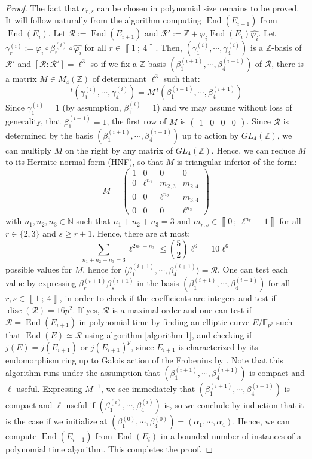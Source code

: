 \documentclass[a4paper,10pt]{report}
\theoremstyle{definition}
\theoremstyle{plain}
\theoremstyle{definition}
\newcommand{\N}{\mathbb{N}}
\newcommand{\Z}{\mathbb{Z}}
\newcommand{\F}{\mathbb{F}}
\newcommand{\m}[1]{\mathcal{#1}}
\renewcommand{\i}[2]{\left\llbracket #1~;~#2\right\rrbracket}
\renewcommand{\(}{\left(}
\renewcommand{\)}{\right)}
\DeclareMathOperator{\End}{End}
\DeclareMathOperator{\disc}{disc}
\begin{document}
\begin{proof}
The fact that $c_{r,s}$ can be chosen in polynomial size remains to be proved. It will follow naturally from the algorithm computing $\End(E_{i+1})$ from $\End(E_i)$. Let $\m{R}:=\End(E_{i+1})$ and $\m{R}':=\Z+\varphi_i\End(E_i)\widehat{\varphi_i}$.  Let $\gamma_r^{(i)}:=\varphi_i\circ\beta_r^{(i)}\circ\widehat{\varphi_i}$ for all $r\in\i{1}{4}$. Then, $(\gamma_1^{(i)},\cdots, \gamma_4^{(i)})$ is a $\Z$-basis of $\m{R}'$ and $[\m{R}:\m{R}']=\ell^3$ so if we fix a $\Z$-basis $(\beta_1^{(i+1)},\cdots, \beta_4^{(i+1)})$ of $\m{R}$, there is a matrix $M\in M_4(\Z)$ of determinant $\ell^3$ such that:
\[\,^t (\gamma_1^{(i)},\cdots, \gamma_4^{(i)})=M \,^t(\beta_1^{(i+1)},\cdots, \beta_4^{(i+1)})\]
Since $\gamma_1^{(i)}=1$ (by assumption, $\beta_1^{(i)}=1$) and we may assume without loss of generality, that $\beta_1^{(i+1)}=1$, the first row of $M$ is $(\begin{array}{cccc}
1 & 0 & 0 & 0
\end{array})$.  Since $\m{R}$ is determined by the basis $(\beta_1^{(i+1)},\cdots, \beta_4^{(i+1)})$ up to action by $GL_4(\Z)$, we can multiply $M$ on the right by any matrix of $GL_4(\Z)$. Hence, we can reduce $M$ to its Hermite normal form (HNF), so that $M$ is triangular inferior of the form:
\[M=\(\begin{array}{cccc}
1 & 0 & 0 & 0\\
0 & \ell^{n_1} & m_{2,3} & m_{2,4}\\
0 & 0 & \ell^{n_2} & m_{3,4} \\
0 & 0 & 0 & \ell^{n_3}
\end{array}\)\]
with $n_1,n_2,n_3\in\N$ such that $n_1+n_2+n_3=3$ and $m_{r,s}\in\i{0}{\ell^{n_r}-1}$ for all $r\in\{2,3\}$ and $s\geq r+1$. Hence, there are at most:
\[\sum_{n_1+n_2+n_3=3} \ell^{2n_1+n_2}\leq \binom{5}{2}\ell^{6}=10\ell^6\]
possible values for $M$, hence for $\langle\beta_1^{(i+1)},\cdots, \beta_4^{(i+1)}\rangle=\m{R}$. One can test each value by expressing $\beta_r^{(i+1)}\beta_s^{(i+1)}$ in the basis $(\beta_1^{(i+1)},\cdots, \beta_4^{(i+1)})$ for all $r,s\in\i{1}{4}$, in order to check if the coefficients are integers and test if $\disc(\m{R})=16p^2$.  If yes, $\m{R}$ is a maximal order and one can test if $\m{R}=\End(E_{i+1})$ in polynomial time by finding an elliptic curve $E/\F_{p^2}$ such that $\End(E)\simeq\m{R}$ using algorithm \ref{algorithm 1}, and checking if $j(E)=j(E_{i+1})$ or $j(E_{i+1})^p$, since $E_{i+1}$ is characterized by its endomorphism ring up to Galois action of the Frobenius by \cite[lemma 42.4.1]{Voight}. Note that this algorithm runs under the assumption that $(\beta_1^{(i+1)},\cdots, \beta_4^{(i+1)})$ is compact and $\ell$-useful. Expressing $M^{-1}$, we see immediately that $(\beta_1^{(i+1)},\cdots, \beta_4^{(i+1)})$ is compact and $\ell$-useful if $(\beta_1^{(i)},\cdots, \beta_4^{(i)})$ is, so we conclude by induction that it is the case if we initialize at $(\beta_1^{(0)},\cdots, \beta_4^{(0)})=(\alpha_1,\cdots,\alpha_4)$. Hence, we can compute $\End(E_{i+1})$ from $\End(E_i)$ in a bounded number of instances of a polynomial time algorithm. This completes the proof. 
\end{proof}
\end{document}
